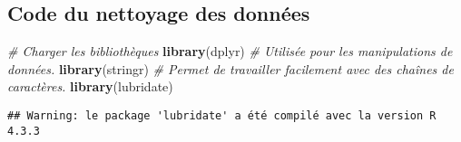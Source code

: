 \documentclass[mstat,12pt]{unswthesis}
\newenvironment{Shaded}{\begin{snugshade}}{\end{snugshade}}
\newcommand{\CommentTok}[1]{\textcolor[rgb]{0.56,0.35,0.01}{\textit{#1}}}
\newcommand{\FunctionTok}[1]{\textcolor[rgb]{0.13,0.29,0.53}{\textbf{#1}}}
\newcommand{\NormalTok}[1]{#1}
\begin{document}
\hypertarget{code-du-nettoyage-des-donnuxe9es}{%
\subsection*{Code du nettoyage des
données}\label{code-du-nettoyage-des-donnuxe9es}}

\begin{Shaded}
\begin{Highlighting}[]
\CommentTok{\# Charger les bibliothèques}
\FunctionTok{library}\NormalTok{(dplyr) }
\CommentTok{\# Utilisée pour les manipulations de données.}
\FunctionTok{library}\NormalTok{(stringr) }
\CommentTok{\# Permet de travailler facilement avec des chaînes de caractères.}
\FunctionTok{library}\NormalTok{(lubridate) }
\end{Highlighting}
\end{Shaded}

\begin{verbatim}
## Warning: le package 'lubridate' a été compilé avec la version R 4.3.3
\end{verbatim}
\end{document}
